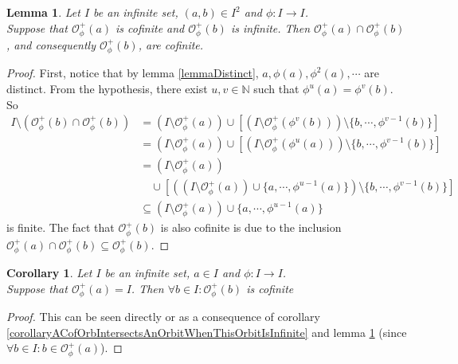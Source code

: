 \documentclass[a4paper,11pt]{article}
\theoremstyle{plain}
\newtheorem{corollary}{Corollary}[section]
\newtheorem{lemma}{Lemma}[section]
\theoremstyle{definition}
\theoremstyle{remark}
\begin{document}
\begin{lemma}
\label{lemmaOrbCofImplications}
Let $I$ be an infinite set, $(a,b) \in I^2$ and $\phi : I \to I$. \\
Suppose that $\mathcal{O}^{+}_\phi(a)$ is cofinite and $\mathcal{O}^{+}_\phi(b)$ is infinite. Then $\mathcal{O}^{+}_\phi(a) \cap \mathcal{O}^{+}_\phi(b)$, and consequently $\mathcal{O}^{+}_\phi(b)$, are cofinite.
\end{lemma}

\begin{proof}
First, notice that by lemma \ref{lemmaDistinct}, $a, \phi(a), \phi^2(a), \cdots$ are distinct. From the hypothesis, there exist $u,v \in \mathbb{N}$ such that $\phi^u(a) = \phi^v(b)$. So 
\begin{align*} 
I \setminus (\mathcal{O}^{+}_\phi(b) \cap \mathcal{O}^{+}_\phi(b)) &= \left( I \setminus  \mathcal{O}^{+}_\phi(a) \right) \cup \left[ \left(I \setminus \mathcal{O}^{+}_\phi(\phi^v(b)) \right) \setminus \{b,\cdots,\phi^{v-1}(b)\} \right] \\
&=  \left( I \setminus  \mathcal{O}^{+}_\phi(a) \right) \cup \left[ \left(I \setminus \mathcal{O}^{+}_\phi(\phi^u(a)) \right) \setminus \{b,\cdots,\phi^{v-1}(b)\} \right] \\
&=  \left( I \setminus  \mathcal{O}^{+}_\phi(a) \right) \\
&\quad \cup \left[ \left( (I \setminus \mathcal{O}^{+}_\phi(a)) \cup \{a,\cdots,\phi^{u-1}(a)\} \right) \setminus \{b,\cdots,\phi^{v-1} (b)\} \right] \\
&\subseteq  (I \setminus  \mathcal{O}^{+}_\phi(a)) \cup \{ a,\cdots,\phi^{u-1}(a) \}
\end{align*}
is finite. The fact that $\mathcal{O}^{+}_\phi(b)$ is also cofinite is due to the inclusion $\mathcal{O}^{+}_\phi(a) \cap \mathcal{O}^{+}_\phi(b) \subseteq \mathcal{O}^{+}_\phi(b)$.
\end{proof}

\begin{corollary}
\label{corollaryOrbPhiIAllOrbCof}
Let $I$ be an infinite set, $a \in I$ and $\phi : I \to I$. \\
Suppose that $\mathcal{O}^{+}_\phi(a) = I$. Then $\forall b \in I : \mathcal{O}^{+}_\phi(b)$ is cofinite
\end{corollary}

\begin{proof}
This can be seen directly or as a consequence of corollary \ref{corollaryACofOrbIntersectsAnOrbitWhenThisOrbitIsInfinite} and lemma \ref{lemmaOrbCofImplications} (since $\forall b \in I : b \in \mathcal{O}^{+}_\phi(a)$).
\end{proof}
\end{document}
